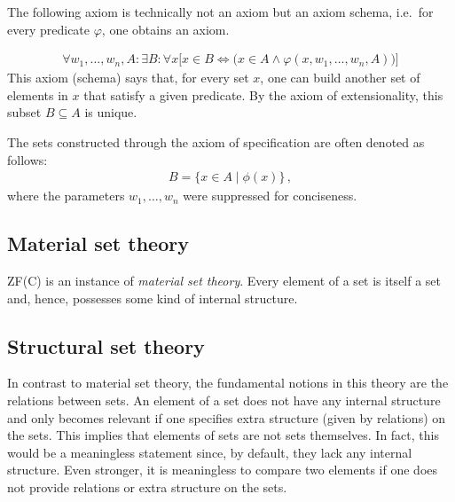     The following axiom is technically not an axiom but an axiom schema, i.e.~for every predicate $\varphi$, one obtains an axiom.
    \begin{axiom}[Specification]
        \begin{gather}
            \forall w_1,\ldots,w_n,A:\exists B:\forall x\bigl[x\in B\iff\bigl(x\in A\land\varphi(x,w_1,\ldots,w_n,A)\bigr)\bigr]
        \end{gather}
        This axiom (schema) says that, for every set $x$, one can build another set of elements in $x$ that satisfy a given predicate. By the axiom of extensionality, this subset $B\subseteq A$ is unique.
    \end{axiom}
    \begin{notation}
        The sets constructed through the axiom of specification are often denoted as follows:
        \begin{gather}
            B=\{x\in A\mid\phi(x)\}\,,
        \end{gather}
        where the parameters $w_1,\ldots,w_n$ were suppressed for conciseness.
    \end{notation}

\subsection{Material set theory}

    ZF(C) is an instance of \textit{material set theory}. Every element of a set is itself a set and, hence, possesses some kind of internal structure.



\subsection{Structural set theory}

    In contrast to material set theory, the fundamental notions in this theory are the relations between sets. An element of a set does not have any internal structure and only becomes relevant if one specifies extra structure (given by relations) on the sets. This implies that elements of sets are not sets themselves. In fact, this would be a meaningless statement since, by default, they lack any internal structure. Even stronger, it is meaningless to compare two elements if one does not provide relations or extra structure on the sets.

